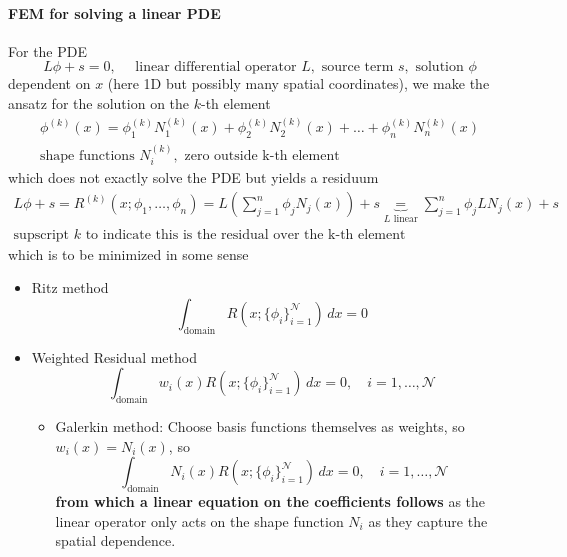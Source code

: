 \paragraph*{FEM for solving a linear PDE}
For the PDE
\begin{equation}
    L\phi + s = 0, \quad \text{ linear differential operator } L, \text{ source term } s, \text{ solution } \phi
\end{equation}
dependent on $x$ (here 1D but possibly many spatial coordinates),
we make the ansatz for the solution on the $k$-th element
\begin{equation}
    \begin{gathered}
        \phi^{(k)}(x) = \phi_1^{(k)} N_1^{(k)}(x) + \phi_2^{(k)} N_2^{(k)}(x) + \dots + \phi_n^{(k)} N_n^{(k)}(x) \\
        \text{shape functions } N_i^{(k)}, \text{ zero outside k-th element}
    \end{gathered}
\end{equation}
which does not exactly solve the PDE but yields a residuum
\begin{equation}
    \begin{gathered}
        L\phi + s = R^{(k)}(x; \phi_1, \dots, \phi_n) = L\left(\sum_{j=1}^n \phi_j N_j(x) \right) + s \underbrace{=}_{L \text{ linear}} \sum_{j=1}^n \phi_j L N_j(x) + s \\
        \text{supscript } k \text{ to indicate this is the residual over the k-th element}
    \end{gathered}
\end{equation}
which is to be minimized in some sense
\begin{itemize}
    \item Ritz method
    \begin{equation}
        \int_{\text{domain}}{R\left(x;\{\phi_i\}_{i=1}^\mathcal{N} \right)} \, dx = 0
    \end{equation}
    \item Weighted Residual method
    \begin{equation}
        \int_{\text{domain}} {w_i(x) R\left(x;\{\phi_i\}_{i=1}^\mathcal{N} \right)} \, dx = 0, \quad i = 1,\dots,\mathcal{N}
    \end{equation}
    \begin{itemize}
        \item \textcolor{blue1}{Galerkin method}: Choose basis functions themselves as weights, so $w_i(x) = N_i(x)$, so
        \begin{equation}
            \int_{\text{domain}} N_i(x) R\left(x;\{\phi_i\}_{i=1}^\mathcal{N} \right) \, dx = 0, \quad i = 1,\dots,\mathcal{N}
        \end{equation}
        \textbf{from which a linear equation on the coefficients follows} as the linear
        operator only acts on the shape function $N_i$ as they capture the spatial dependence.
    \end{itemize}
\end{itemize}

